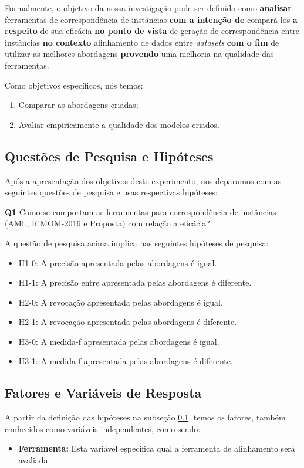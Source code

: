 Formalmente, o objetivo da nossa investigação pode ser definido como \textbf{analisar} ferramentas de correspondência de instâncias \textbf{com a intenção de}  compará-los \textbf{a respeito} de sua eficácia \textbf{no ponto de vista} de geração de correspondência entre instâncias \textbf{no contexto} alinhamento de dados entre \textit{datasets} \textbf{com o fim} de utilizar as melhores abordagens \textbf{provendo} uma melhoria na qualidade das ferramentas.

Como objetivos específicos, nós temos:
\begin{enumerate}[label=\roman*]
\item Comparar as abordagens criadas;
\item Avaliar empiricamente a qualidade dos modelos criados.
\end{enumerate}


\subsection{Questões de Pesquisa e Hipóteses}
\label{sub:hipoteses}
Após a apresentação dos objetivos deste experimento, nos deparamos com as seguintes questões de pesquisa e usas respectivas hipóteses:

\textbf{Q1} Como se comportam as ferramentas para correspondência de instâncias (AML, RiMOM-2016 e Proposta) com relação a eficácia? 

A questão de pesquisa acima implica nas seguintes hipóteses de pesquisa:

\begin{itemize}
\item H1-0: A precisão apresentada pelas abordagens é igual.
\item H1-1: A precisão entre apresentada pelas abordagens é diferente.
\item H2-0: A revocação apresentada pelas abordagens é igual.
\item H2-1: A revocação apresentada pelas abordagens é diferente.
\item H3-0: A medida-f apresentada pelas abordagens é igual.
\item H3-1: A medida-f apresentada pelas abordagens é diferente.
\end{itemize}

\subsection{Fatores e Variáveis de Resposta}
A partir da definição das hipóteses na subseção \ref{sub:hipoteses}, temos os fatores, também conhecidos como variáveis independentes, como sendo:
\begin{itemize}
	\item \textbf{Ferramenta:} Esta variável especifica qual a ferramenta de alinhamento será avaliada
\end{itemize}


